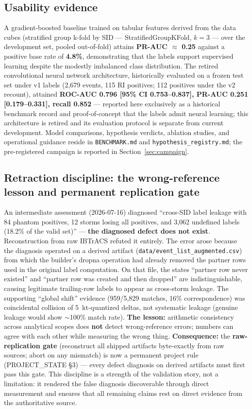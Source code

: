 \documentclass[11pt]{article}
\begin{document}
\subsection{Usability evidence}

A gradient-boosted baseline trained on tabular features derived from the data
cubes (stratified group k-fold by SID --- StratifiedGroupKFold, $k=3$ --- over
the development set, pooled out-of-fold) attains \textbf{PR-AUC $\approx$ 0.25}
against a positive base rate of \textbf{4.8\%}, demonstrating that the labels
support supervised learning despite the modestly imbalanced class distribution.
The retired convolutional neural network architecture, historically evaluated
on a frozen test set under v1 labels (2{,}679 events, 115 RI positives; 112
positives under the v2 recount), attained \textbf{ROC-AUC 0.796 [95\% CI
0.753--0.837], PR-AUC 0.251 [0.179--0.331], recall 0.852} --- reported here
exclusively as a historical benchmark record and proof-of-concept that the
labels admit neural learning; this architecture is retired and its evaluation
protocol is separate from current development. Model comparisons, hypothesis
verdicts, ablation studies, and operational guidance reside in
\texttt{BENCHMARK.md} and \texttt{hypothesis\_registry.md}; the pre-registered
campaign is reported in Section~\ref{sec:campaign}.

\subsection{Retraction discipline: the wrong-reference lesson and permanent
replication gate}

An intermediate assessment (2026-07-16) diagnosed ``cross-SID label leakage
with 84 phantom positives, 12 storms losing all positives, and 3{,}062
undefined labels (18.2\% of the valid set)'' --- \textbf{the diagnosed defect
does not exist}. Reconstruction from raw IBTrACS refuted it entirely. The error
arose because the diagnosis operated on a derived artifact
(\texttt{data/event\_list\_augmented.csv}) from which the builder's dropna
operation had already removed the partner rows used in the original label
computation. On that file, the states ``partner row never existed'' and
``partner row was created and then dropped'' are indistinguishable, causing
legitimate trailing-row labels to appear as cross-storm leakage. The supporting
``global shift'' evidence (959/5{,}829 matches, 16\% correspondence) was
coincidental collision of 5~kt-quantized deltas, not systematic leakage
(genuine leakage would show $\sim$100\% match rate). \textbf{The lesson:}
arithmetic consistency across analytical scopes does \textbf{not} detect
wrong-reference errors; numbers can agree with each other while measuring the
wrong thing. \textbf{Consequence:} the \textbf{raw-replication gate}
(reconstruct all shipped artifacts byte-exactly from raw sources; abort on any
mismatch) is now a permanent project rule (PROJECT\_STATE \S3) --- every defect
diagnosis on derived artifacts must first pass this gate. This discipline is a
strength of the validation story, not a limitation: it rendered the false
diagnosis discoverable through direct measurement and ensures that all
remaining claims rest on direct evidence from the authoritative source.
\end{document}
